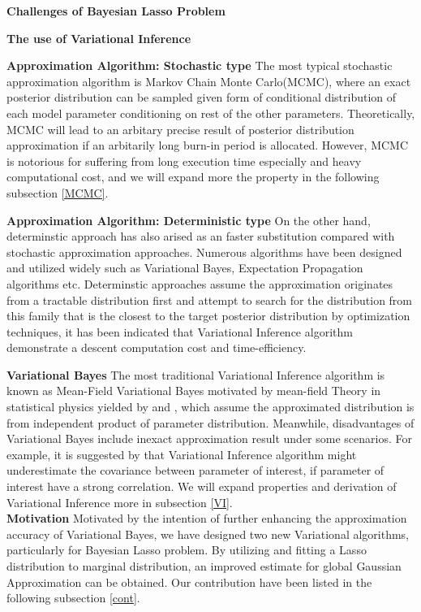 \textbf{Challenges of Bayesian Lasso Problem}

\textbf{The use of Variational Inference}





\textbf{Approximation Algorithm: Stochastic type}
The most typical stochastic approximation algorithm is Markov Chain Monte Carlo(MCMC), where an exact posterior distribution can be sampled given form of conditional distribution of each model parameter conditioning on rest of the other parameters. Theoretically, MCMC will lead to an arbitary precise result of posterior distribution approximation if an arbitarily long burn-in period is allocated. However, MCMC is notorious for suffering from long execution time especially and heavy computational cost, and we will expand more the property in the following subsection \ref{MCMC}.

\textbf{Approximation Algorithm: Deterministic type}
On the other hand, determinstic approach has also arised as an faster substitution compared with stochastic approximation approaches. Numerous algorithms have been designed and utilized widely such as Variational Bayes, Expectation Propagation algorithms etc. Determinstic approaches assume the approximation originates from a tractable distribution first and attempt to search for the distribution from this family that is the closest to the target posterior distribution by optimization techniques, it has been indicated that Variational Inference algorithm demonstrate a descent computation cost and time-efficiency. 

\textbf{Variational Bayes}
The most traditional Variational Inference algorithm is known as Mean-Field Variational Bayes motivated by mean-field Theory in statistical physics yielded by 
\cite{jordan_ghahramani_jaakkola_saul_1998} and \cite{attias_1999}, which assume the approximated distribution is from independent product of parameter distribution.
Meanwhile, disadvantages of Variational Bayes include inexact approximation result under some scenarios. For example, it is suggested by \cite{bishop_2006} that Variational Inference algorithm might underestimate the covariance between parameter of interest, if parameter of interest have a strong correlation. We will expand properties and derivation of Variational Inference more in subsection \ref{VI}.\\

\textbf{Motivation}
Motivated by the intention of further enhancing the approximation accuracy of Variational Bayes, we have designed two new Variational algorithms, particularly for Bayesian Lasso problem. By utilizing and fitting a Lasso distribution to marginal distribution, an improved estimate for global Gaussian Approximation can be obtained. Our contribution have been listed in the following subsection \ref{cont}.\\



